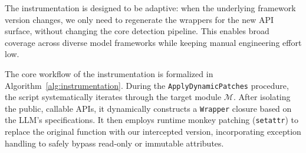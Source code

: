 The instrumentation is designed to be adaptive: when the underlying framework version changes, we only need to regenerate the wrappers for the new API surface, without changing the core detection pipeline. This enables broad coverage across diverse model frameworks while keeping manual engineering effort low.

\begin{algorithm}[htbp]
\caption{Automated Dynamic Instrumentation Logic}
\label{alg:instrumentation}


\end{algorithm}

The core workflow of the instrumentation is formalized in Algorithm~\ref{alg:instrumentation}. During the \texttt{ApplyDynamicPatches} procedure, the script systematically iterates through the target module $\mathcal{M}$. After isolating the public, callable APIs, it dynamically constructs a \texttt{Wrapper} closure based on the LLM's specifications. It then employs runtime monkey patching (\texttt{setattr}) to replace the original function with our intercepted version, incorporating exception handling to safely bypass read-only or immutable attributes.

